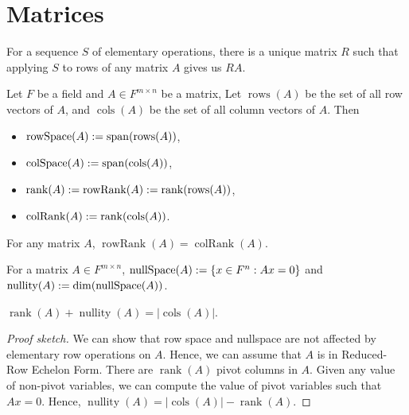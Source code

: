 \documentclass[a4paper,12pt,fleqn]{article}
\newenvironment*{tightemize}{\begin{itemize}[noitemsep]}{\end{itemize}}
\DeclareMathOperator{\Span}{span}
\DeclareMathOperator{\rank}{rank}
\DeclareMathOperator{\rows}{rows}
\DeclareMathOperator{\cols}{cols}
\DeclareMathOperator{\nullSpace}{nullSpace}
\DeclareMathOperator{\nullity}{nullity}
\begin{document}
\section{Matrices}

\begin{lemma}
For a sequence $S$ of elementary operations, there is a unique matrix $R$ such that
applying $S$ to rows of any matrix $A$ gives us $RA$.
\end{lemma}

\begin{definition}
Let $F$ be a field and $A \in F^{m \times n}$ be a matrix,
Let $\rows(A)$ be the set of all row vectors of $A$,
and $\cols(A)$ be the set of all column vectors of $A$. Then
\begin{tightemize}
\item $\operatorname{rowSpace}(A) \defeq \Span(\rows(A))$,
\item $\operatorname{colSpace}(A) \defeq \Span(\cols(A))$,
\item $\rank(A) \defeq \operatorname{rowRank}(A) \defeq \rank(\rows(A))$,
\item $\operatorname{colRank}(A) \defeq \rank(\cols(A))$.
\end{tightemize}
\end{definition}

\begin{theorem}[DWAP]
For any matrix $A$, $\operatorname{rowRank}(A) = \operatorname{colRank}(A)$.
\end{theorem}

\begin{definition}
For a matrix $A \in F^{m \times n}$, $\nullSpace(A) \defeq \{x \in F^n: Ax = 0\}$
and $\nullity(A) \defeq \dim(\nullSpace(A))$.
\end{definition}

\begin{theorem}
$\rank(A) + \nullity(A) = |\cols(A)|$.
\end{theorem}
\begin{proof}[Proof sketch]
We can show that row space and nullspace are not affected by elementary row operations on $A$.
Hence, we can assume that $A$ is in Reduced-Row Echelon Form.
There are $\rank(A)$ pivot columns in $A$.
Given any value of non-pivot variables, we can compute the value of pivot variables
such that $Ax = 0$. Hence, $\nullity(A) = |\cols(A)| - \rank(A)$.
\end{proof}
\end{document}
